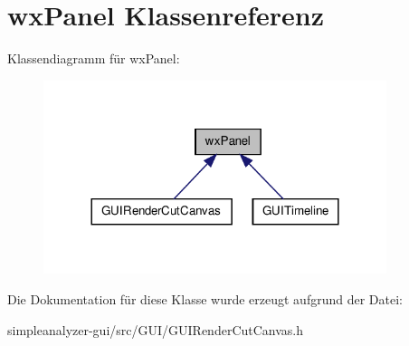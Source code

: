 \hypertarget{classwxPanel}{\section{wx\-Panel Klassenreferenz}
\label{classwxPanel}
}


Klassendiagramm für wx\-Panel\-:
\nopagebreak
\begin{figure}[H]
\begin{center}
\leavevmode
\includegraphics[width=284pt]{classwxPanel__inherit__graph}
\end{center}
\end{figure}


Die Dokumentation für diese Klasse wurde erzeugt aufgrund der Datei\-:\begin{DoxyCompactItemize}
\item 
simpleanalyzer-\/gui/src/\-G\-U\-I/G\-U\-I\-Render\-Cut\-Canvas.\-h\end{DoxyCompactItemize}
